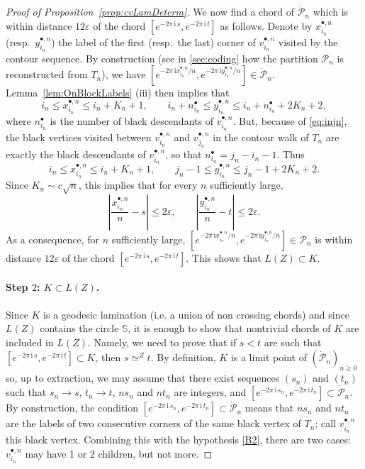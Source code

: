 \documentclass[AHL,XML,longabstracts,Unicode]{cedram}
\def\S{\mathbb{S}}
\def\PPP{\mathcal P}
\def\dPn{\dot{\mathcal{P}}_{n}}
\renewcommand{\epsilon}{\varepsilon}
\begin{document}
\begin{proof}[Proof of Proposition~\ref{prop:cvLamDeterm}]
We now find a chord of $ \dPn $ which is within distance $12\epsilon$ of the chord $[e^{-2\pi\, \textrm{i}\, s}, e^{-2\pi\, \textrm{i}\, t}]$ as follows. Denote by  $x^{\bullet,n}_{i_{n}}$ (resp.~$y ^{\bullet,n}_{i_{n}}$)  the label of the first (resp.~the last) corner of $v^{\bullet,n}_{i_{n}}$ visited by the contour sequence.
By construction (see in \cref{sec:coding} how the partition $\PPP_{n} $ is reconstructed from $T_{n}$),
we have $[e^{-2\pi\, \textrm{i} {x^{\bullet,n}_{i_{n}}}/{n}}, e^{-2\pi\, \textrm{i} {y ^{\bullet,n}_{i_{n}}}/{n}}] \in \dPn$.
Lemma~\ref{lem:OnBlockLabels}  (iii) then implies that
\begin{equation}
  i_{n} \leq x^{\bullet,n}_{i_{n}} \leq i_{n}+ K_{n}+1, \qquad  i_{n}+n^{\bullet}_{i_{n}} \leq y^{\bullet,n}_{i_{n}} \leq   i_{n}+n^{\bullet}_{i_{n}} + 2 K_{n}+2,
  \label{eq:Control_xy}
\end{equation}
where $n^{\bullet}_{i_{n}} $ is the number of black descendants of $v^{\bullet,n}_{i_{n}}$.
But, because of \eqref{eq:injn},  the black vertices visited between $v^{\bullet,n}_{i_{n}}$ and $v^{\bullet,n}_{j_{n}}$
in the contour walk of $T_{n}$ are exactly the black descendants of $v^{\bullet,n}_{i_{n}}$,
so that $n^{\bullet}_{i_{n}}= j_{n}-i_{n}-1$. Thus
\[i_{n} \leq x^{\bullet,n}_{i_{n}} \leq i_{n}+ K_{n}+1, \qquad  j_{n}-1 \leq y^{\bullet,n}_{i_{n}} \leq    j_{n}-1 + 2 K_{n}+2.\]
Since $K_{n} \sim c \sqrt{n}$, this implies that for every $n$ sufficiently large,
\[\left| \frac{x^{\bullet,n}_{i_{n}}}{n}-s \right| \leq 2 \epsilon, \qquad   \left| \frac{y^{\bullet,n}_{i_{n}}}{n}-t \right|  \leq 2 \epsilon.\]
As a consequence, for $n$ sufficiently large, $[e^{-2\pi\, \textrm{i} {x^{\bullet,n}_{i_{n}}}/{n}}, e^{-2\pi\, \textrm{i} {y ^{\bullet,n}_{i_{n}}}/{n}}] \in\dPn$  is within distance $12\epsilon$ of the chord $[e^{-2\pi\, \textrm{i}\, s}, e^{-2\pi\, \textrm{i}\, t}]$. This shows that $ L(Z)   \subset K$.

\paragraph*{Step $2$: $ K \subset L(Z)$.}
Since $K$ is a geodesic lamination (i.e. a union of non crossing chords) and since $L(Z)$ contains the circle $\S$,
it is enough to show that nontrivial chords of $K$ are included in $L(Z)$.
Namely, we need to prove that if $s<t$ are such that $[e^{-2\pi\, \textrm{i}\, s}, e^{-2\pi\, \textrm{i}\, t}] \subset K$,
then $s \simeq^Z t$.
By definition, $K$ is a limit point of $(\dPn)_{n \ge 0}$
so, up to extraction, we may assume that there exist sequences $(s_{n})$ and $(t_{n})$
such that $s_{n} \rightarrow s$, $t_{n} \rightarrow t$, $n s_{n}$ and $n t_{n}$ are integers, and $[e^{-2\pi\, \textrm{i}\, s_{n}}, e^{-2\pi\, \textrm{i}\, t_{n}}] \subset \dPn$.
By construction,
the condition $[e^{-2\pi\, \textrm{i}\, s_{n}}, e^{-2\pi\, \textrm{i}\, t_{n}}] \subset \dPn$
means that
$ns_n$ and $nt_n$ are the labels of two consecutive corners of the same black vertex of $T_n$;
call $v^{\bullet,n}_{i_{n}}$ this black vertex.
Combining this with the hypothesis \ref{B2}, there are two cases:
$v^{\bullet,n}_{i_{n}}$ may have 1 or 2 children, but not more.


\end{proof}
\end{document}
